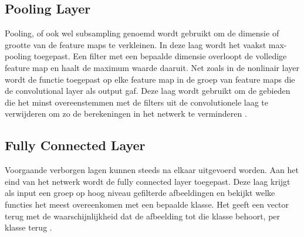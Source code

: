 \subsection{Pooling Layer}
\label{ssec:Pooling layer}
Pooling, of ook wel subsampling genoemd wordt gebruikt om de dimensie of grootte van de feature maps te verkleinen. In deze laag wordt het vaakst max-pooling toegepast. Een filter met een bepaalde dimensie overloopt de volledige feature map en haalt de maximum waarde daaruit. Net zoals in de nonlinair layer wordt de functie toegepast op elke feature map in de groep van feature maps die de convolutional layer als output gaf. Deze laag wordt gebruikt om de gebieden die het minst overeenstemmen met de filters uit de convolutionele laag te verwijderen om zo de berekeningen in het netwerk te verminderen \autocite{jeremy}.

\subsection{Fully Connected Layer}
\label{ssec:Fully Connected Layer}
Voorgaande verborgen lagen kunnen steeds na elkaar uitgevoerd worden. Aan het eind van het netwerk wordt de fully connected layer toegepast. Deze laag krijgt als input een groep op hoog niveau gefilterde afbeeldingen en bekijkt welke functies het meest overeenkomen met een bepaalde klasse. Het geeft een vector terug met de waarschijnlijkheid dat de afbeelding tot die klasse behoort, per klasse terug \autocite{ujjwalkarn}.